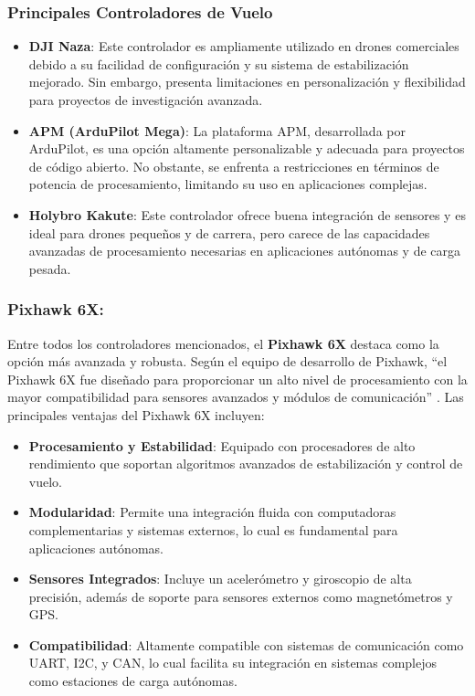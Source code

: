\documentclass{article}
\begin{document}
\subsubsection{Principales Controladores de Vuelo}
\begin{itemize}
    \item \textbf{DJI Naza}: Este controlador es ampliamente utilizado en drones comerciales debido a su facilidad de configuración y su sistema de estabilización mejorado. Sin embargo, presenta limitaciones en personalización y flexibilidad para proyectos de investigación avanzada.
    \item \textbf{APM (ArduPilot Mega)}: La plataforma APM, desarrollada por ArduPilot, es una opción altamente personalizable y adecuada para proyectos de código abierto. No obstante, se enfrenta a restricciones en términos de potencia de procesamiento, limitando su uso en aplicaciones complejas.
    \item \textbf{Holybro Kakute}: Este controlador ofrece buena integración de sensores y es ideal para drones pequeños y de carrera, pero carece de las capacidades avanzadas de procesamiento necesarias en aplicaciones autónomas y de carga pesada.
\end{itemize}

\subsubsection{Pixhawk 6X: }

Entre todos los controladores mencionados, el \textbf{Pixhawk 6X} destaca como la opción más avanzada y robusta. Según el equipo de desarrollo de Pixhawk, “el Pixhawk 6X fue diseñado para proporcionar un alto nivel de procesamiento con la mayor compatibilidad para sensores avanzados y módulos de comunicación” \cite{pixhawk_docs}. Las principales ventajas del Pixhawk 6X incluyen:
\begin{itemize}
    \item \textbf{Procesamiento y Estabilidad}: Equipado con procesadores de alto rendimiento que soportan algoritmos avanzados de estabilización y control de vuelo.
    \item \textbf{Modularidad}: Permite una integración fluida con computadoras complementarias y sistemas externos, lo cual es fundamental para aplicaciones autónomas.
    \item \textbf{Sensores Integrados}: Incluye un acelerómetro y giroscopio de alta precisión, además de soporte para sensores externos como magnetómetros y GPS.
    \item \textbf{Compatibilidad}: Altamente compatible con sistemas de comunicación como UART, I2C, y CAN, lo cual facilita su integración en sistemas complejos como estaciones de carga autónomas.
\end{itemize}
\end{document}
